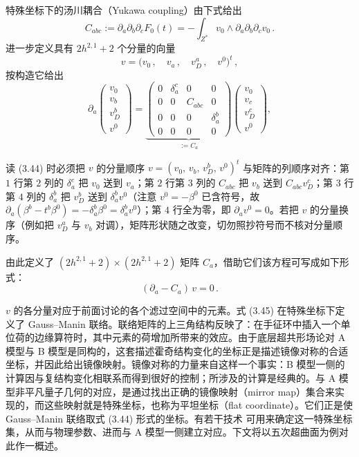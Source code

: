 特殊坐标下的汤川耦合（Yukawa coupling）由下式给出
\begin{equation}\tag{3.42}
C_{abc}:=\partial_a\partial_b\partial_cF_0(t)=-\int_{Z^*}v_0\wedge\partial_a\partial_b\partial_cv_0\,.
\end{equation}
进一步定义具有 $2h^{2,1}+2$ 个分量的向量
\begin{equation}\tag{3.43}
v=\bigl(v_0\,,\quad v_a\,,\quad v^a_D\,,\quad v^0\bigr)^t\,,
\end{equation}
按构造它给出
\begin{equation}\tag{3.44}
\partial_a
\begin{pmatrix}
v_0\\ v_b\\ v^b_D\\ v^0
\end{pmatrix}
=\underbrace{
\begin{pmatrix}
0 & \delta^c_a & 0 & 0\\
0 & 0 & C_{abc} & 0\\
0 & 0 & 0 & \delta^b_a\\
0 & 0 & 0 & 0
\end{pmatrix}}_{:=C_a}
\begin{pmatrix}
v_0\\ v_c\\ v^c_D\\ v^0
\end{pmatrix},
\end{equation}
\begin{yizhu}[易错点]
读 (3.44) 时必须把 $v$ 的分量顺序 $v=(v_0,\,v_b,\,v^b_D,\,v^0)^t$ 与矩阵的列顺序对齐：第 $1$ 行第 $2$ 列的 $\delta^c_a$ 把 $v_0$ 送到 $v_a$；第 $2$ 行第 $3$ 列的 $C_{abc}$ 把 $v_b$ 送到 $C_{abc}v^c_D$；第 $3$ 行第 $4$ 列的 $\delta^b_a$ 把 $v^b_D$ 送到 $\delta^b_a v^0$（注意 $v^0=-\beta^0$ 已含符号，故 $\partial_a(\beta^b-t^b\beta^0)=-\delta^b_a\beta^0=\delta^b_a v^0$）；第 $4$ 行全为零，即 $\partial_av^0=0$。若把 $v$ 的分量换序（例如把 $v^a_D$ 与 $v_b$ 对调），矩阵形状随之改变，切勿照抄符号而不核对分量顺序。
\end{yizhu}

由此定义了 $(2h^{2,1}+2)\times(2h^{2,1}+2)$ 矩阵 $C_a$，借助它们该方程可写成如下形式：
\begin{equation}\tag{3.45}
(\partial_a-C_a)\,v=0\,.
\end{equation}


$v$ 的各分量对应于前面讨论的各个滤过空间中的元素。式 (3.45) 在特殊坐标下定义了 Gauss--Manin 联络。联络矩阵的上三角结构反映了：在手征环中插入一个单位荷的边缘算符时，其中元素的荷增加所带来的效应。由于底层超共形场论对 A 模型与 B 模型是同构的，这套描述霍奇结构变化的坐标正是描述镜像对称的合适坐标，并因此给出镜像映射。镜像对称的力量来自这样一个事实：B 模型一侧的计算因与复结构变化相联系而得到很好的控制；所涉及的计算是经典的。与 A 模型非平凡量子几何的对应，是通过找出正确的镜像映射（mirror map）集合来实现的，而这些映射就是特殊坐标，也称为平坦坐标（flat coordinate）。它们正是使 Gauss--Manin 联络取式 (3.44) 形式的坐标。有若干技术 \cite{ref50,ref57,ref58,ref51,ref60,ref61,ref62,ref63,ref28} 可用来确定这一特殊坐标集，从而与物理参数、进而与 A 模型一侧建立对应。下文将以五次超曲面为例对此作一概述。

